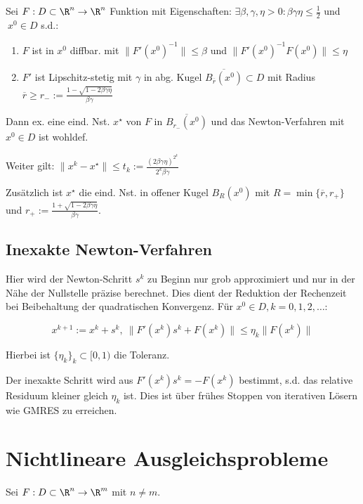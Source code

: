 Sei $F : D \subset \R^n \to \R^n$ Funktion mit Eigenschaften: $\exists \beta, \gamma, \eta > 0 : \beta\gamma\eta \leq \frac{1}{2}$ und $\ x^0 \in D$ s.d.:

\begin{enumerate}[label=(\roman*)]
	\item $F$ ist in $x^0$ diffbar. mit $\|F'(x^0)^{-1}\| \leq \beta$ und $\|F'(x^0)^{-1}F(x^0)\| \leq \eta$
	\item $F'$ ist Lipschitz-stetig mit $\gamma$ in abg. Kugel $\overline{B_{\overline r}(x^0)} \subset D$ mit Radius $\overline r \geq r_- := \frac{1-\sqrt{1-2\beta\gamma\eta}}{\beta\gamma}$
\end{enumerate}

Dann ex. eine eind. Nst. $x^\star$ von $F$ in $\overline{B_{r_-}(x^0)}$ und das Newton-Verfahren mit $x^0 \in D$ ist wohldef.

Weiter gilt: $\|x^k-x^\star\| \leq t_k := \frac{(2\beta\gamma\eta)^{2^k}}{2^k\beta\gamma}$

Zusätzlich ist $x^\star$ die eind. Nst. in offener Kugel $B_R(x^0)$ mit $R=\min\{\overline r,r_+\}$ und $r_+ := \frac{1+\sqrt{1-2\beta\gamma\eta}}{\beta\gamma}$.

\subsection*{Inexakte Newton-Verfahren}

Hier wird der Newton-Schritt $s^k$ zu Beginn nur grob approximiert und nur in der Nähe der Nullstelle präzise berechnet. Dies dient der Reduktion der Rechenzeit bei Beibehaltung der quadratischen Konvergenz. Für $x^0 \in D, k = 0,1,2,\dots$:

\vspace*{-4mm}
$$x^{k+1} := x^k + s^k, \ \|F'(x^k)s^k + F(x^k)\| \leq \eta_k \|F(x^k)\|$$

Hierbei ist $\{\eta_k\}_k \subset [0,1)$ die Toleranz.

Der inexakte Schritt wird aus $F'(x^k)s^k = -F(x^k)$ bestimmt, s.d. das relative Residuum kleiner gleich $\eta_k$ ist. Dies ist über frühes Stoppen von iterativen Lösern wie GMRES zu erreichen.

\section*{Nichtlineare Ausgleichsprobleme}

Sei $F : D \subset \R^n \to \R^m$ mit $n \neq m$.

